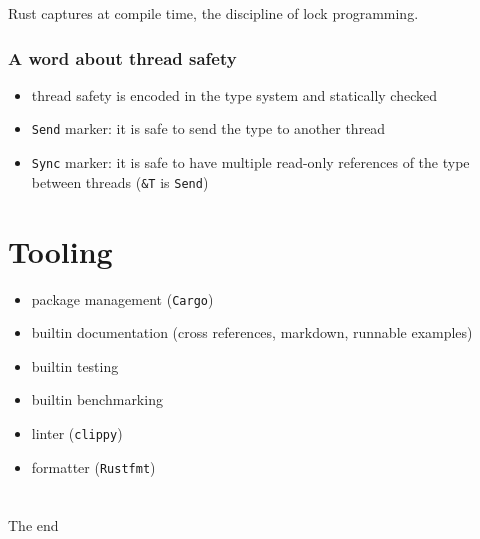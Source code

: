 \documentclass{beamer}
\begin{document}
\begin{frame}
    Rust captures at compile time, the discipline of lock programming.
\end{frame}

\begin{frame}
    \frametitle{A word about thread safety}
    \begin{itemize}
        \item thread safety is encoded in the type system and statically checked
        \item \texttt{Send} marker: it is safe to send the type to another thread
        \item \texttt{Sync} marker: it is safe to have multiple read-only references of the type between threads (\texttt{\&T} is \texttt{Send})
    \end{itemize}
\end{frame}

\section{Tooling}

\begin{frame}
    \begin{itemize}
        \item package management (\texttt{Cargo})
        \item builtin documentation (cross references, markdown, runnable examples)
        \item builtin testing
        \item builtin benchmarking
        \item linter (\texttt{clippy})
        \item formatter (\texttt{Rustfmt})
    \end{itemize}
\end{frame}


\section*{}

{%
    \begin{frame}
        \begin{center}
            The end
        \end{center}
    \end{frame}
}
\end{document}
